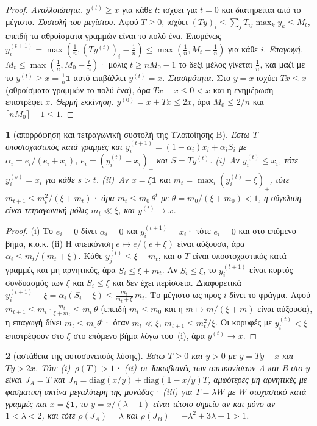 \documentclass[11pt,a4paper]{article}
\theoremstyle{definition}
\theoremstyle{plain}
\newcommand{\genpropname}{}
\newtheorem*{genprop}{\genpropname}
\newenvironment{prop}[1]{\renewcommand{\genpropname}{Πρόταση #1}\begin{genprop}}{\end{genprop}}
\newcommand{\diag}{\mathrm{diag}}
\newcommand{\one}{\mathbf{1}}
\begin{document}
\begin{proof}
\emph{Αναλλοιώτητα.} $y^{(t)}\ge x$ για κάθε $t$: ισχύει για $t=0$ και διατηρείται από το μέγιστο. \emph{Συστολή του μεγίστου.} Αφού $T\ge0$, ισχύει $(Ty)_i\le\sum_jT_{ij}\max_ky_k\le M_t$, επειδή τα αθροίσματα γραμμών είναι το πολύ ένα. Επομένως $y_i^{(t+1)}=\max(\tfrac1n,(Ty^{(t)})_i-\tfrac1n)\le\max(\tfrac1n,M_t-\tfrac1n)$ για κάθε $i$. \emph{Επαγωγή.} $M_t\le\max(\tfrac1n,M_0-\tfrac tn)$· μόλις $t\ge nM_0-1$ το δεξί μέλος γίνεται $\tfrac1n$, και μαζί με το $y^{(t)}\ge x=\tfrac1n\one$ αυτό επιβάλλει $y^{(t)}=x$. \emph{Στασιμότητα.} Στο $y=x$ ισχύει $Tx\le x$ (αθροίσματα γραμμών το πολύ ένα), άρα $Tx-x\le0<x$ και η ενημέρωση επιστρέφει $x$. \emph{Θερμή εκκίνηση.} $y^{(0)}=x+Tx\le2x$, άρα $M_0\le2/n$ και $\lceil nM_0\rceil-1\le1$.
\end{proof}

\begin{prop}{B}[απορρόφηση και τετραγωνική συστολή της Υλοποίησης Β]
Έστω $T$ υποστοχαστικός κατά γραμμές και $y^{(t+1)}_i=(1-\alpha_i)x_i+\alpha_iS_i$ με $\alpha_i=e_i/(e_i+x_i)$, $e_i=(y_i^{(t)}-x_i)_+$ και $S=Ty^{(t)}$. (i)~Αν $y_i^{(t)}\le x_i$, τότε $y_i^{(s)}=x_i$ για κάθε $s>t$. (ii)~Αν $x=\xi\one$ και $m_t=\max_i(y_i^{(t)}-\xi)_+$, τότε $m_{t+1}\le m_t^2/(\xi+m_t)$· άρα $m_t\le m_0\,\theta^t$ με $\theta=m_0/(\xi+m_0)<1$, η σύγκλιση είναι τετραγωνική μόλις $m_t\ll\xi$, και $y^{(t)}\to x$.
\end{prop}

\begin{proof}
(i) Το $e_i=0$ δίνει $\alpha_i=0$ και $y_i^{(t+1)}=x_i$· τότε $e_i=0$ και στο επόμενο βήμα, κ.ο.κ. (ii) Η απεικόνιση $e\mapsto e/(e+\xi)$ είναι αύξουσα, άρα $\alpha_i\le m_t/(m_t+\xi)$. Κάθε $y_j^{(t)}\le\xi+m_t$, και ο $T$ είναι υποστοχαστικός κατά γραμμές και μη αρνητικός, άρα $S_i\le\xi+m_t$. Αν $S_i\le\xi$, το $y_i^{(t+1)}$ είναι κυρτός συνδυασμός των $\xi$ και $S_i\le\xi$ και δεν έχει περίσσεια. Διαφορετικά $y_i^{(t+1)}-\xi=\alpha_i(S_i-\xi)\le\frac{m_t}{m_t+\xi}\,m_t$. Το μέγιστο ως προς $i$ δίνει το φράγμα. Αφού $m_{t+1}\le m_t\cdot\frac{m_t}{\xi+m_t}\le m_t\,\theta$ (επειδή $m_t\le m_0$ και η $m\mapsto m/(\xi+m)$ είναι αύξουσα), η επαγωγή δίνει $m_t\le m_0\theta^t$· όταν $m_t\ll\xi$, $m_{t+1}\le m_t^2/\xi$. Οι κορυφές με $y^{(t)}_i<\xi$ επιστρέφουν στο $\xi$ στο επόμενο βήμα λόγω του~(i), άρα $y^{(t)}\to x$.
\end{proof}

\begin{prop}{C}[αστάθεια της αυτοσυνεπούς λύσης]
Έστω $T\ge0$ και $y>0$ με $y=Ty-x$ και $Ty>2x$. Τότε (i)~$\rho(T)>1$· (ii)~οι Ιακωβιανές των απεικονίσεων Α και Β στο $y$ είναι $J_A=T$ και $J_B=\diag(x/y)+\diag(\one-x/y)T$, αμφότερες μη αρνητικές με φασματική ακτίνα μεγαλύτερη της μονάδας· (iii)~για $T=\lambda W$ με $W$ στοχαστικό κατά γραμμές και $x=\xi\one$, το $y=x/(\lambda-1)$ είναι τέτοιο σημείο αν και μόνο αν $1<\lambda<2$, και τότε $\rho(J_A)=\lambda$ και $\rho(J_B)=-\lambda^2+3\lambda-1>1$.
\end{prop}
\end{document}
